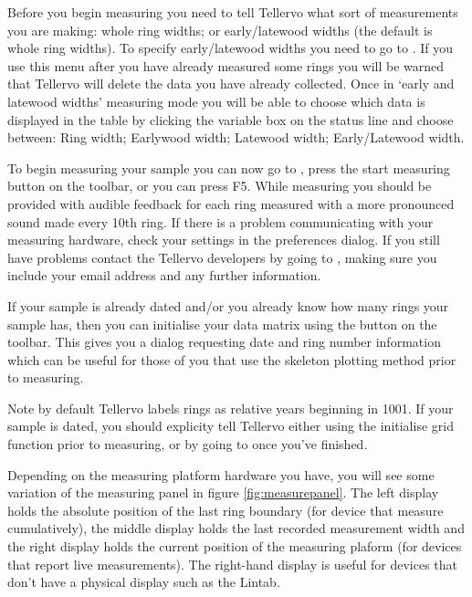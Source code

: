 Before you begin measuring you need to tell Tellervo what sort of measurements you are making: whole ring widths; or early/latewood widths (the default is whole ring widths).  To specify early/latewood widths you need to go to .  If you use this menu after you have already measured some rings you will be warned that Tellervo will delete the data you have already collected.  Once in `early and latewood widths' measuring mode you will be able to choose which data is displayed in the table by clicking the variable box on the status line and choose between: Ring width; Earlywood width; Latewood width; Early/Latewood width.

To begin measuring your sample you can now go to , press the start measuring button on the toolbar, or you can press F5. While measuring you should be provided with audible feedback for each ring measured with a more pronounced sound made every 10th ring. If there is a problem communicating with your measuring hardware, check your settings in the preferences dialog. If you still have problems contact the Tellervo developers by going to , making sure you include your email address and any further information.

If your sample is already dated and/or you already know how many rings your sample has, then you can initialise your data matrix using the button on the toolbar.  This gives you a dialog requesting date and ring number information which can be useful for those of you that use the skeleton plotting method prior to measuring.  

Note by default Tellervo labels rings as relative years beginning in 1001.  If your sample is dated, you should explicity tell Tellervo either using the initialise grid function prior to measuring, or by going to  once you've finished.

Depending on the measuring platform hardware you have, you will see some variation of the measuring panel in figure \ref{fig:measurepanel}. The left display holds the absolute position of the last ring boundary (for device that measure cumulatively), the middle display holds the last recorded measurement width and the right display holds the current position of the measuring plaform (for devices that report live measurements).  The right-hand display is useful for devices that don't have a physical display such as the Lintab. 

